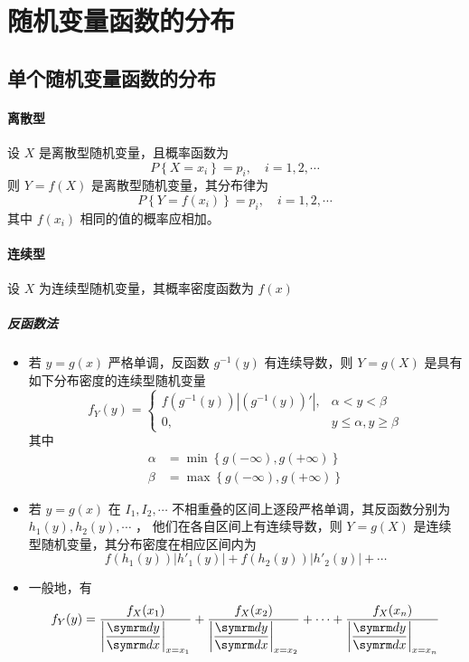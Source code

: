 \section{随机变量函数的分布}

\subsection{单个随机变量函数的分布}

\paragraph{离散型} 设 $ X $ 是离散型随机变量，且概率函数为
$$ P\left\{ X = x_i \right\} = p_i, \quad i = 1, 2, \cdots $$
则 $ Y = f(X) $ 是离散型随机变量，其分布律为
$$ P\left\{ Y = f(x_i) \right\} = p_i, \quad i = 1, 2, \cdots $$
其中 $ f(x_i) $ 相同的值的概率应相加。

\paragraph{连续型} 设 $ X $ 为连续型随机变量，其概率密度函数为 $ f(x) $

\subparagraph{反函数法}
\begin{itemize}[leftmargin=\subparitemindent]
    \item 若 $ y = g(x) $ 严格单调，反函数 $ g^{-1}(y) $ 有连续导数，则 $ Y = g(X) $ 是具有如下分布密度的连续型随机变量
    $$ f_Y(y) = \left\{ \begin{array}{ll}
        f(g^{-1}(y))\left| (g^{-1}(y))' \right|, & \alpha < y < \beta \\
        0, & y \leqslant \alpha , y \geqslant \beta
    \end{array} \right. $$
    其中
    \begin{align*}
        \alpha & = \min \left\{ g(-\infty), g(+\infty) \right\} \\
        \beta & = \max \left\{ g(-\infty), g(+\infty) \right\}
    \end{align*}
    \item 若 $ y = g(x) $ 在 $ I_1, I_2, \cdots $ 不相重叠的区间上逐段严格单调，其反函数分别为 $ h_1(y), h_2(y), \cdots$ ，
    他们在各自区间上有连续导数，则 $ Y = g(X) $ 是连续型随机变量，其分布密度在相应区间内为
    $$ f(h_1(y))\left| h'_1(y) \right| + f(h_2(y))\left| h'_2(y) \right| + \cdots $$
    \item 一般地，有
    $$ f_Y(y) = \ddfrac{f_X(x_1)}{
        \left| \frac{\diff y}{\diff x} \right|_{x = x_1}
    } + \ddfrac{f_X(x_2)}{
        \left| \frac{\diff y}{\diff x} \right|_{x = x_2}
    } + \cdots + \ddfrac{f_X(x_n)}{
        \left| \frac{\diff y}{\diff x} \right|_{x = x_n}
    } $$
\end{itemize}

